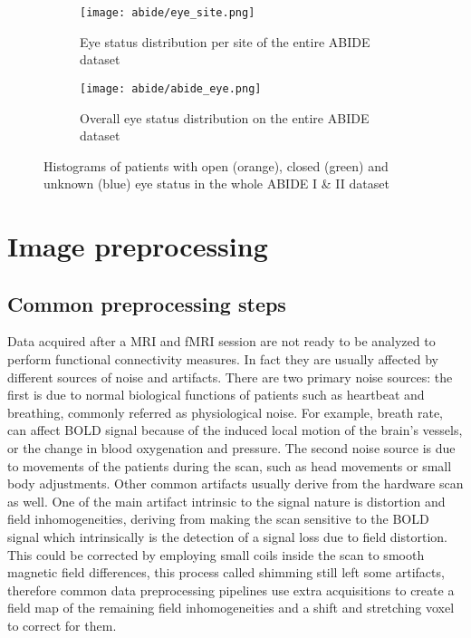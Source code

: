 \documentclass[11pt]{report}
\begin{document}
\begin{figure}
\begin{subfigure}{0.7\linewidth}
\texttt{[image: abide/eye\_site.png]}
\caption{Eye status distribution per site of the entire ABIDE dataset}
\label{fig:abideeyesite}
\end{subfigure}
\begin{subfigure}{0.4\linewidth}
\texttt{[image: abide/abide\_eye.png]}
\caption{Overall eye status distribution on the entire ABIDE dataset}
\label{fig:abideeye}
\end{subfigure}
\caption{Histograms of patients with open (orange), closed (green) and unknown (blue) eye status in the whole ABIDE I \& II dataset}
\label{}
\end{figure}







\chapter{Image preprocessing}\label{chap:image_preprocessing}
\section{Common preprocessing steps}
\label{sec:preprocessing_steps}

Data acquired after a MRI and fMRI session are not ready to be analyzed to perform functional connectivity measures.
In fact they are usually affected by different sources of noise and artifacts.
There are two primary noise sources: the first is due to normal biological functions of patients such as heartbeat and breathing, commonly referred as physiological noise.
For example, breath rate, can affect BOLD signal because of the induced local motion of the brain's vessels, or the change in blood oxygenation and pressure. The second noise source is due to movements of the patients during the scan, such as head movements or small body adjustments.
Other common artifacts usually derive from the hardware scan as well.
One of the main artifact intrinsic to the signal nature is distortion and field inhomogeneities, deriving from making the scan sensitive to the BOLD signal which intrinsically is the detection of a signal loss due to field distortion.
This could be corrected by employing small coils inside the scan to smooth magnetic field differences, this process called shimming still left some artifacts, therefore common data preprocessing pipelines use extra acquisitions to create a field map of the remaining field inhomogeneities and a shift and stretching voxel to correct for them.\cite{bijsterbosch2017}
\end{document}
